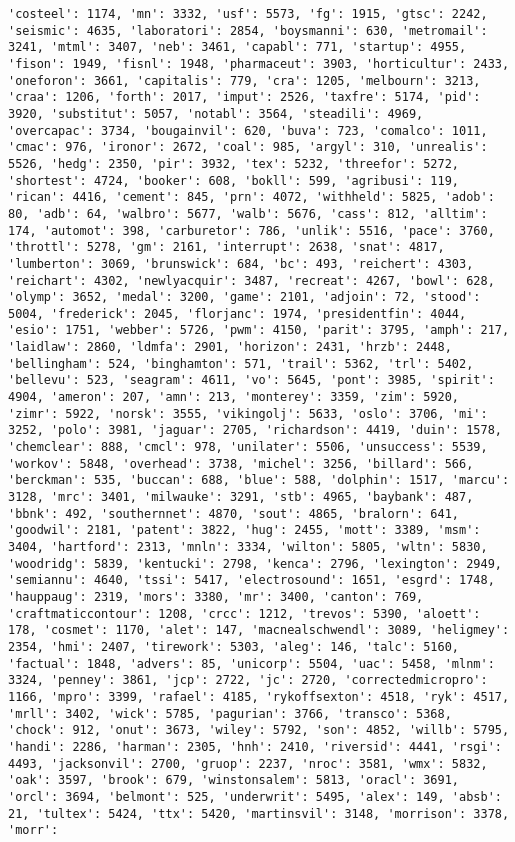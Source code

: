 \documentclass[11pt]{article}
\begin{document}
\begin{Verbatim}[commandchars=\\\{\}]
'costeel': 1174, 'mn': 3332, 'usf': 5573, 'fg': 1915, 'gtsc': 2242, 'seismic': 4635, 'laboratori': 2854, 'boysmanni': 630, 'metromail': 3241, 'mtml': 3407, 'neb': 3461, 'capabl': 771, 'startup': 4955, 'fison': 1949, 'fisnl': 1948, 'pharmaceut': 3903, 'horticultur': 2433, 'oneforon': 3661, 'capitalis': 779, 'cra': 1205, 'melbourn': 3213, 'craa': 1206, 'forth': 2017, 'imput': 2526, 'taxfre': 5174, 'pid': 3920, 'substitut': 5057, 'notabl': 3564, 'steadili': 4969, 'overcapac': 3734, 'bougainvil': 620, 'buva': 723, 'comalco': 1011, 'cmac': 976, 'ironor': 2672, 'coal': 985, 'argyl': 310, 'unrealis': 5526, 'hedg': 2350, 'pir': 3932, 'tex': 5232, 'threefor': 5272, 'shortest': 4724, 'booker': 608, 'bokll': 599, 'agribusi': 119, 'rican': 4416, 'cement': 845, 'prn': 4072, 'withheld': 5825, 'adob': 80, 'adb': 64, 'walbro': 5677, 'walb': 5676, 'cass': 812, 'alltim': 174, 'automot': 398, 'carburetor': 786, 'unlik': 5516, 'pace': 3760, 'throttl': 5278, 'gm': 2161, 'interrupt': 2638, 'snat': 4817, 'lumberton': 3069, 'brunswick': 684, 'bc': 493, 'reichert': 4303, 'reichart': 4302, 'newlyacquir': 3487, 'recreat': 4267, 'bowl': 628, 'olymp': 3652, 'medal': 3200, 'game': 2101, 'adjoin': 72, 'stood': 5004, 'frederick': 2045, 'florjanc': 1974, 'presidentfin': 4044, 'esio': 1751, 'webber': 5726, 'pwm': 4150, 'parit': 3795, 'amph': 217, 'laidlaw': 2860, 'ldmfa': 2901, 'horizon': 2431, 'hrzb': 2448, 'bellingham': 524, 'binghamton': 571, 'trail': 5362, 'trl': 5402, 'bellevu': 523, 'seagram': 4611, 'vo': 5645, 'pont': 3985, 'spirit': 4904, 'ameron': 207, 'amn': 213, 'monterey': 3359, 'zim': 5920, 'zimr': 5922, 'norsk': 3555, 'vikingolj': 5633, 'oslo': 3706, 'mi': 3252, 'polo': 3981, 'jaguar': 2705, 'richardson': 4419, 'duin': 1578, 'chemclear': 888, 'cmcl': 978, 'unilater': 5506, 'unsuccess': 5539, 'workov': 5848, 'overhead': 3738, 'michel': 3256, 'billard': 566, 'berckman': 535, 'buccan': 688, 'blue': 588, 'dolphin': 1517, 'marcu': 3128, 'mrc': 3401, 'milwauke': 3291, 'stb': 4965, 'baybank': 487, 'bbnk': 492, 'southernnet': 4870, 'sout': 4865, 'bralorn': 641, 'goodwil': 2181, 'patent': 3822, 'hug': 2455, 'mott': 3389, 'msm': 3404, 'hartford': 2313, 'mnln': 3334, 'wilton': 5805, 'wltn': 5830, 'woodridg': 5839, 'kentucki': 2798, 'kenca': 2796, 'lexington': 2949, 'semiannu': 4640, 'tssi': 5417, 'electrosound': 1651, 'esgrd': 1748, 'hauppaug': 2319, 'mors': 3380, 'mr': 3400, 'canton': 769, 'craftmaticcontour': 1208, 'crcc': 1212, 'trevos': 5390, 'aloett': 178, 'cosmet': 1170, 'alet': 147, 'macnealschwendl': 3089, 'heligmey': 2354, 'hmi': 2407, 'tirework': 5303, 'aleg': 146, 'talc': 5160, 'factual': 1848, 'advers': 85, 'unicorp': 5504, 'uac': 5458, 'mlnm': 3324, 'penney': 3861, 'jcp': 2722, 'jc': 2720, 'correctedmicropro': 1166, 'mpro': 3399, 'rafael': 4185, 'rykoffsexton': 4518, 'ryk': 4517, 'mrll': 3402, 'wick': 5785, 'pagurian': 3766, 'transco': 5368, 'chock': 912, 'onut': 3673, 'wiley': 5792, 'son': 4852, 'willb': 5795, 'handi': 2286, 'harman': 2305, 'hnh': 2410, 'riversid': 4441, 'rsgi': 4493, 'jacksonvil': 2700, 'gruop': 2237, 'nroc': 3581, 'wmx': 5832, 'oak': 3597, 'brook': 679, 'winstonsalem': 5813, 'oracl': 3691, 'orcl': 3694, 'belmont': 525, 'underwrit': 5495, 'alex': 149, 'absb': 21, 'tultex': 5424, 'ttx': 5420, 'martinsvil': 3148, 'morrison': 3378, 'morr': 
\end{Verbatim}
\end{document}

